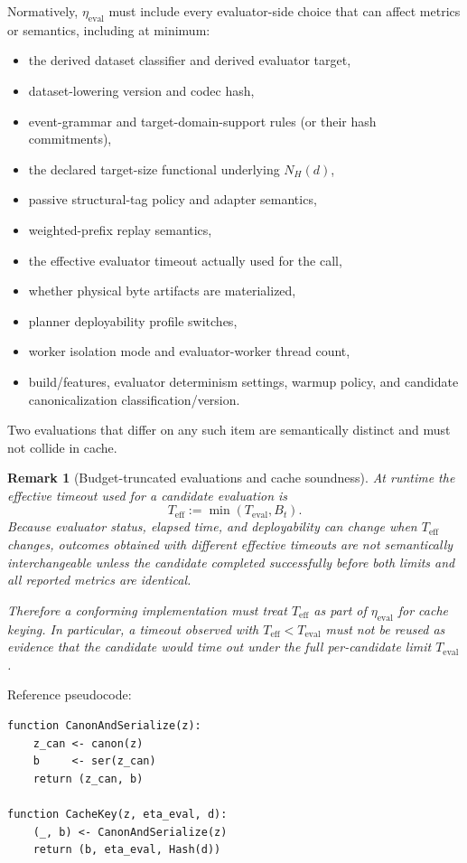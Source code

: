 \documentclass[11pt]{article}
\newtheorem{remark}{Remark}
\begin{document}
Normatively,
$\eta_{\mathrm{eval}}$ must include every evaluator-side choice that can affect
metrics or semantics, including at minimum:
\begin{itemize}
    \item the derived dataset classifier and derived evaluator target,
    \item dataset-lowering version and codec hash,
    \item event-grammar and target-domain-support rules (or their hash
    commitments),
    \item the declared target-size functional underlying $N_H(d)$,
    \item passive structural-tag policy and adapter semantics,
    \item weighted-prefix replay semantics,
    \item the effective evaluator timeout actually used for the call,
    \item whether physical byte artifacts are materialized,
    \item planner deployability profile switches,
    \item worker isolation mode and evaluator-worker thread count,
    \item build/features, evaluator determinism settings, warmup policy, and
    candidate canonicalization classification/version.
\end{itemize}
Two evaluations that differ on any such item are semantically distinct and must
not collide in cache.

\begin{remark}[Budget-truncated evaluations and cache soundness]
At runtime the effective timeout used for a candidate evaluation is
\[
T_{\mathrm{eff}}:=\min(T_{\mathrm{eval}},B_t).
\]
Because evaluator status, elapsed time, and deployability can change when
$T_{\mathrm{eff}}$ changes, outcomes obtained with different effective
timeouts are not semantically interchangeable unless the candidate completed
successfully before both limits and all reported metrics are identical.

Therefore a conforming implementation must treat $T_{\mathrm{eff}}$ as part of
$\eta_{\mathrm{eval}}$ for cache keying. In particular, a timeout observed
with $T_{\mathrm{eff}}<T_{\mathrm{eval}}$ must not be reused as evidence that
the candidate would time out under the full per-candidate limit
$T_{\mathrm{eval}}$.
\end{remark}

Reference pseudocode:
\begin{verbatim}
function CanonAndSerialize(z):
    z_can <- canon(z)
    b     <- ser(z_can)
    return (z_can, b)

function CacheKey(z, eta_eval, d):
    (_, b) <- CanonAndSerialize(z)
    return (b, eta_eval, Hash(d))
\end{verbatim}
\end{document}

